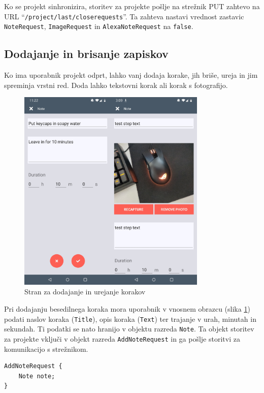 \documentclass[a4paper, 12pt]{book}
\begin{document}
Ko se projekt sinhronizira, storitev za projekte pošlje na strežnik PUT zahtevo na URL \enquote{\texttt{/project/last/closerequests}}.
Ta zahteva nastavi vrednost zastavic \texttt{NoteRequest}, \texttt{ImageRequest} in \texttt{AlexaNoteRequest} na \texttt{false}.


\subsection{Dodajanje in brisanje zapiskov}

Ko ima uporabnik projekt odprt, lahko vanj dodaja korake, jih briše, ureja in jim spreminja vrstni red.
Doda lahko tekstovni korak ali korak s fotografijo.

\begin{figure}[H]
\begin{center}
	\includegraphics[width=9cm]{app_note_image}
\end{center}
	\caption{Stran za dodajanje in urejanje korakov}
\label{app_note}
\end{figure}

Pri dodajanju besedilnega koraka mora uporabnik v vnosnem obrazcu (slika \ref{app_note}) podati naslov koraka (\texttt{Title}), opis koraka (\texttt{Text}) ter trajanje v urah, minutah in sekundah.
Ti podatki se nato hranijo v objektu razreda \texttt{Note}.
Ta objekt storitev za projekte vključi v objekt razreda \texttt{AddNoteRequest} in ga pošlje storitvi za komunikacijo s strežnikom.

\begin{Verbatim}[commandchars=+\[\]]
AddNoteRequest { 
    Note note; 
}
\end{Verbatim}
\end{document}
